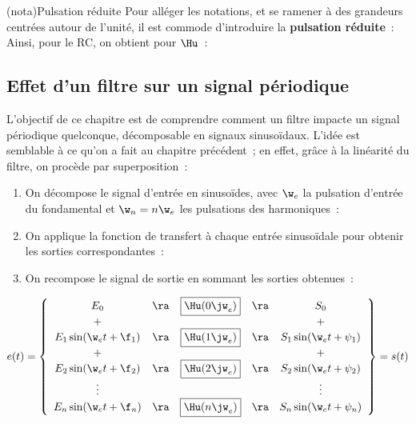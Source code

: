\documentclass[../../main/main.tex]{subfiles}
\begin{document}
\begin{tcb*}(nota){Pulsation réduite}
	Pour alléger les notations, et se ramener à des grandeurs centrées autour de
	l'unité, il est commode d'introduire la \textbf{pulsation réduite}~:
	\psw{
		\[
			x = \frac{\w}{\w_c}
		\]
	}
	Ainsi, pour le RC, on obtient pour $\Hu$~:
	\psw{
		\[
			\Hu(x) = \frac{1}{1+\jx}
		\]
	}
	\vspace{-15pt}
\end{tcb*}

\subsection{Effet d'un filtre sur un signal périodique}

L'objectif de ce chapitre est de comprendre comment un filtre impacte un signal
périodique quelconque, décomposable en signaux sinusoïdaux. L'idée est semblable
à ce qu'on a fait au chapitre précédent~; en effet, grâce à la linéarité du
filtre, on procède par superposition~:
\begin{enumerate}
	\item On décompose le signal d'entrée en sinusoïdes, avec $\w_e$ la pulsation
	      d'entrée du fondamental et $\w_n = n\w_e$ les pulsations des harmoniques~:
	      \psw{
		      \[
			      e(t) = E_0 + \sum_{n=1}^{+\infty} E_n \sin(\w_n t + \f_n)
		      \]
	      }
	      \vspace{-15pt}
	\item On applique la fonction de transfert à chaque entrée sinusoïdale pour
	      obtenir les sorties correspondantes~:
	      \psw{
		      \[
			      s_n(t) = S_n \sin(\w_n t + \psi_n)
			      \qav
			      S_n = E_n \times \abs{\Hu(\jw_n)}
			      \qet
			      \psi_n = \f_n + \arg*{\Hu(\jw_n})
		      \]
	      }
	      \vspace{-15pt}
	\item On recompose le signal de sortie en sommant les sorties obtenues~:
	      \psw{
		      \[
			      s(t) = \sum_{n=0}^{+\infty}s_n(t)
		      \]
	      }
	      \vspace{-15pt}
\end{enumerate}

\[
	e(t) =
	\left\{
	\begin{array}{ccccc}
		E_0                    & \ra & \fbox{$\Hu(0\jw_e)$} & \ra & S_0
		\\
		+                      &     &                      &     & +
		\\
		E_1\sin(\w_e t + \f_1) & \ra & \fbox{$\Hu(1\jw_e)$} & \ra & S_1\sin(\w_e t + \psi_1)
		\\
		+                      &     &                      &     & +
		\\
		E_2\sin(\w_e t + \f_2) & \ra & \fbox{$\Hu(2\jw_e)$} & \ra & S_2\sin(\w_e t + \psi_2)
		\\
		\vdots                 &     &                      &     & \vdots
		\\
		E_n\sin(\w_e t + \f_n) & \ra & \fbox{$\Hu(n\jw_e)$} & \ra & S_n\sin(\w_e t + \psi_n)
	\end{array}
	\right\} = s(t)
\]
\end{document}

